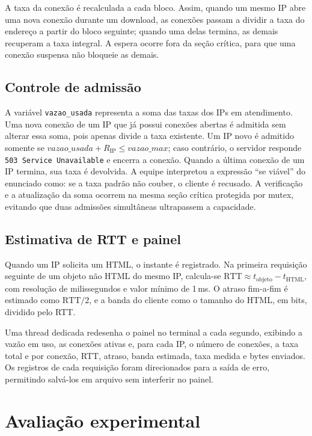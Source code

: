 \documentclass[12pt,a4paper]{article}
\begin{document}
A taxa da conexão é recalculada a cada bloco. Assim, quando um mesmo IP abre uma nova
conexão durante um download, as conexões passam a dividir a taxa do endereço a partir do
bloco seguinte; quando uma delas termina, as demais recuperam a taxa integral. A espera
ocorre fora da seção crítica, para que uma conexão suspensa não bloqueie as demais.

\subsection{Controle de admissão}

A variável \texttt{vazao\_usada} representa a soma das taxas dos IPs em atendimento. Uma
nova conexão de um IP que já possui conexões abertas é admitida sem alterar essa soma,
pois apenas divide a taxa existente. Um IP novo é admitido somente se
$\mathit{vazao\_usada} + R_{\mathrm{IP}} \le \mathit{vazao\_max}$; caso contrário, o
servidor responde \texttt{503 Service Unavailable} e encerra a conexão. Quando a última
conexão de um IP termina, sua taxa é devolvida. A equipe interpretou a expressão ``se
viável'' do enunciado como: se a taxa padrão não couber, o cliente é recusado. A verificação
e a atualização da soma ocorrem na mesma seção crítica protegida por mutex, evitando que
duas admissões simultâneas ultrapassem a capacidade.

\subsection{Estimativa de RTT e painel}

Quando um IP solicita um HTML, o instante é registrado. Na primeira requisição seguinte de
um objeto não HTML do mesmo IP, calcula-se
$\mathrm{RTT} \approx t_{\mathrm{objeto}} - t_{\mathrm{HTML}}$, com resolução de
milissegundos e valor mínimo de 1\,ms. O atraso fim-a-fim é estimado como $\mathrm{RTT}/2$, e
a banda do cliente como o tamanho do HTML, em bits, dividido pelo RTT.

Uma thread dedicada redesenha o painel no terminal a cada segundo, exibindo a vazão em uso,
as conexões ativas e, para cada IP, o número de conexões, a taxa total e por conexão, RTT,
atraso, banda estimada, taxa medida e bytes enviados. Os registros de cada requisição foram
direcionados para a saída de erro, permitindo salvá-los em arquivo sem interferir no painel.

\section{Avaliação experimental}
\end{document}
